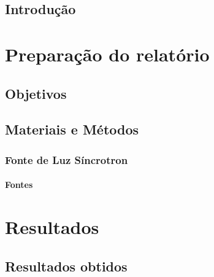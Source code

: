 \documentclass[
	12pt,				%
	openany,			%
	oneside,			%
	a4paper,			%
	english,			%
	french,				%
	spanish,			%
	brazil,				%
	sumario=tradicional]{abntex2}
\begin{document}
\textual

\chapter*[Introdução]{Introdução}
\lipsum[50]

\part{Preparação do relatório}

\chapter{Objetivos}
\lipsum[24]


\chapter{Materiais e Métodos}
\lipsum[24] \cite{Sigma}

\section{Fonte de Luz Síncrotron}
\lipsum[24]

\subsection{Fontes}
\lipsum[24]


\part{Resultados}\label{Resultados}

\chapter{Resultados obtidos}
\lipsum[24]
\end{document}
